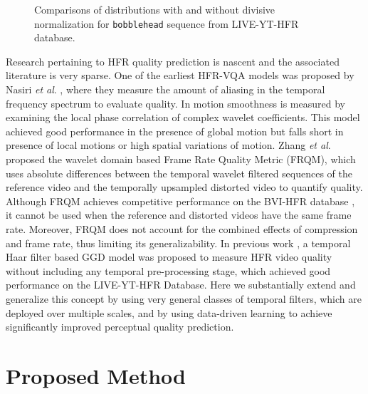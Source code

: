 \documentclass[journal]{IEEEtran}
\newcommand{\etal}{\textit{et al}. }
\begin{document}
\begin{figure*}[!t]
    \centering
     \hfill
    \caption{Comparisons of distributions with and without divisive normalization for \texttt{bobblehead} sequence from LIVE-YT-HFR database.}
    \label{fig:dist_compare}
\end{figure*}

Research pertaining to HFR quality prediction is nascent and the associated literature is very sparse. One of the earliest HFR-VQA models was proposed by Nasiri \etal \cite{nasiri2017perceptual}, where they measure the amount of aliasing in the temporal frequency spectrum to evaluate quality. In \cite{nasiri2018temporal} motion smoothness is measured by examining the local phase correlation of complex wavelet coefficients. This model achieved good performance in the presence of global motion but falls short in presence of local motions or high spatial variations of motion. Zhang \etal \cite{zhang2017frame} proposed the wavelet domain based Frame Rate Quality Metric (FRQM), which uses absolute differences between the temporal wavelet filtered sequences of the reference video and the temporally upsampled distorted video to quantify quality. Although FRQM achieves competitive performance on the BVI-HFR database \cite{mackin2018study}, it cannot be used when the reference and distorted videos have the same frame rate. Moreover, FRQM does not account for the combined effects of compression and frame rate, thus limiting its generalizability.
In previous work \cite{pavan2020gsti}, a temporal Haar filter based GGD model was proposed to measure HFR video quality without including any temporal pre-processing stage, which achieved good performance on the LIVE-YT-HFR Database. Here we substantially extend and generalize this concept by using very general classes of temporal filters, which are deployed over multiple scales, and by using data-driven learning to achieve significantly improved perceptual quality prediction.

\section{Proposed Method}
\label{sec:Objective_VQA}
\end{document}
